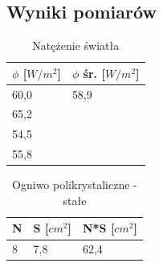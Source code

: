\documentclass[12pt,a4paper]{article}
\begin{document}
\subsection{Wyniki pomiarów}

\begin{table}[H]
\centering
\caption{Natężenie światła}
\label{my-label}
\begin{tabular}{|p{3cm}|p{3cm}|}
\hline
$\phi$ {[}$W/m^2${]} & $\phi$ śr. {[}$W/m^2${]}\\
\hline
60,0	& 58,9   \\
65,2    &        \\
54,5    &        \\
55,8    &        \\
\hline   
\end{tabular}
\end{table}

\begin{table}[H]
\centering
\caption{Ogniwo polikrystaliczne - stałe}
\label{polistale}
\begin{tabular}{|p{2cm}|p{2cm}|p{2cm}|}
\hline
N & S {[}$cm^2${]} & N*S {[}$cm^2${]}   \\
\hline
8 & 7,8 & 62,4 \\
\hline
\end{tabular}
\end{table}
\end{document}
